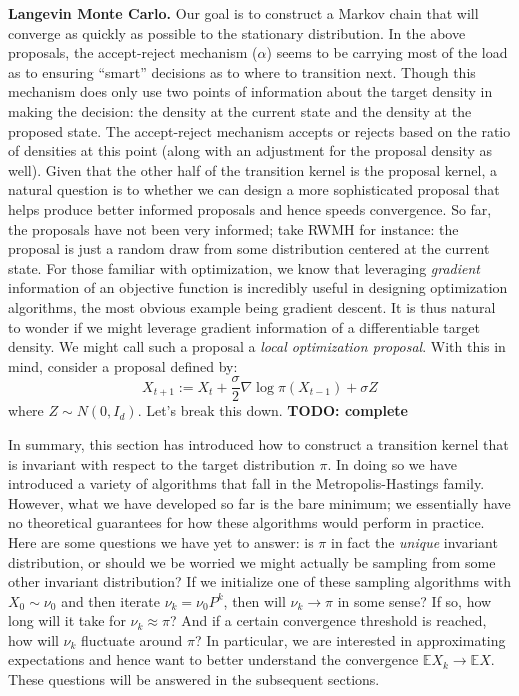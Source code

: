 \documentclass[12pt]{article}
\newcommand{\E}{\mathbb{E}}
\begin{document}
\bigskip

\textbf{Langevin Monte Carlo.} Our goal is to construct a Markov chain that will converge as quickly as possible to the stationary distribution. In the above proposals, the 
accept-reject mechanism ($\alpha$) seems to be carrying most of the load as to ensuring ``smart'' decisions as to where to transition next. Though this mechanism does 
only use two points of information about the target density in making the decision: the density at the current state and the density at the proposed state. The accept-reject 
mechanism accepts or rejects based on the ratio of densities at this point (along with an adjustment for the proposal density as well). Given that the other half of the 
transition kernel is the proposal kernel, a natural question is to whether we can design a more sophisticated proposal that helps produce better informed proposals and 
hence speeds convergence. So far, the proposals have not been very informed; take RWMH for instance: the proposal is just a random draw from some distribution 
centered at the current state. For those familiar with optimization, we know that leveraging \textit{gradient} information of an objective function is incredibly 
useful in designing optimization algorithms, the most obvious example being gradient descent. It is thus natural to wonder if we might leverage gradient information 
of a differentiable target density. We might call such a proposal a \textit{local optimization proposal}. With this in mind, consider a proposal defined by: 
\[X_{t + 1} := X_{t} + \frac{\sigma}{2} \nabla \log \pi(X_{t - 1}) + \sigma Z\]
where $Z \sim N(0, I_d)$. Let's break this down. \textbf{TODO: complete}


In summary, this section has introduced how to construct a transition kernel that is invariant with respect to the target distribution $\pi$. In doing so we have introduced 
a variety of algorithms that fall in the Metropolis-Hastings family. However, what we have developed so far is the bare minimum; we essentially have no theoretical guarantees
for how these algorithms would perform in practice. Here are some questions we have yet to answer: is $\pi$ in fact the \textit{unique} invariant distribution, or should we be worried
we might actually be sampling from some other invariant distribution? If we initialize one of these sampling algorithms with $X_0 \sim \nu_0$ and then iterate 
$\nu_{k} = \nu_0 P^k$, then will $\nu_k \to \pi$ in some sense? If so, how long will it take for $\nu_k \approx \pi$? And if a certain convergence threshold is reached, how will 
$\nu_k$ fluctuate around $\pi$? In particular, we are interested in approximating expectations and hence want to better understand the convergence
$\E X_k \to \E X$. These questions will be answered in the subsequent sections. 
\end{document}
